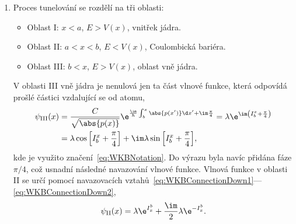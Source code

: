 \begin{solution}
	\begin{enumerate}
	\item
		Proces tunelování se rozdělí na tři oblasti:
		\begin{itemize}
		\item
			Oblast I: $x<a$, $E>V(x)$, vnitřek jádra.
		\item
			Oblast II: $a<x<b$, $E<V(x)$, Coulombická bariéra.
		\item
			Oblast III: $b<x$, $E>V(x)$, oblast vně jádra.
		\end{itemize}
		
		V oblasti III vně jádra je nenulová jen ta část vlnové funkce, která odpovídá prošlé částici vzdalující se od atomu,
		\begin{align}
			\psi_{\mathrm{III}}(x)
				&=\frac{C}{\sqrt{\abs{p(x)}}}\e^{\frac{\im}{\hbar}\int_{b}^{x}\abs{p(x')}\d x'+\im\frac{\pi}{4}}
				 =\lambda\e^{\im\left(I_{b}^{x}+\frac{\pi}{4}\right)}\nonumber\\
				&=\lambda\cos{\left[I_{b}^{x}+\frac{\pi}{4}\right]}+\im\lambda\sin{\left[I_{b}^{x}+\frac{\pi}{4}\right]},
		\end{align}
		kde je využito značení~\eqref{eq:WKBNotation}. 
		Do výrazu byla navíc přidána fáze $\pi/4$, což usnadní následné navazování vlnové funkce.
		Vlnová funkce v oblasti II se určí pomocí navazovacích vztahů~\eqref{eq:WKBConnectionDown1}---\eqref{eq:WKBConnectionDown2},
		\begin{equation}
			\psi_{\mathrm{II}}(x)=\lambda\e^{I_{x}^{b}}+\frac{\im}{2}\lambda\e^{-I_{x}^{b}}.
		\end{equation}
		

\end{enumerate}
\end{solution}

